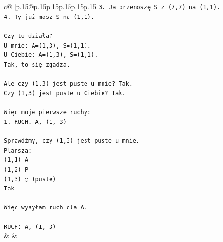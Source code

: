 \documentclass{article}
\begin{document}
{\begin{supertabular}{c@{$\;$}|p{.15\linewidth}@{}p{.15\linewidth}p{.15\linewidth}p{.15\linewidth}p{.15\linewidth}p{.15\linewidth}}
{{{\texttt{3. Ja przenoszę S z (7,7) na (1,1).} \\
\texttt{4. Ty już masz S na (1,1).} \\
\\ 
\texttt{Czy to działa?} \\
\texttt{U mnie: A=(1,3), S=(1,1).} \\
\texttt{U Ciebie: A=(1,3), S=(1,1).} \\
\texttt{Tak, to się zgadza.} \\
\\ 
\texttt{Ale czy (1,3) jest puste u mnie? Tak.} \\
\texttt{Czy (1,3) jest puste u Ciebie? Tak.} \\
\\ 
\texttt{Więc moje pierwsze ruchy:} \\
\texttt{1. RUCH: A, (1, 3)} \\
\\ 
\texttt{Sprawdźmy, czy (1,3) jest puste u mnie.} \\
\texttt{Plansza:} \\
\texttt{(1,1) A} \\
\texttt{(1,2) P} \\
\texttt{(1,3) ◌ (puste)} \\
\texttt{Tak.} \\
\\ 
\texttt{Więc wysyłam ruch dla A.} \\
\\ 
\texttt{RUCH: A, (1, 3)} \\
            }
        }
    }
    & & \\ \\


\end{supertabular}}
\end{document}

